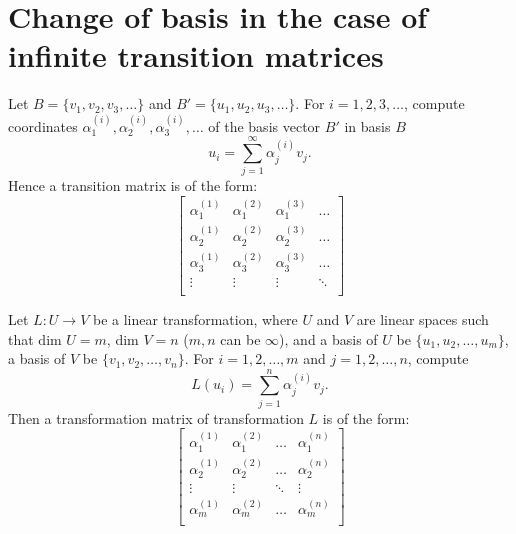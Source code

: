 \section{Change of basis in the case of infinite transition matrices }
Let $B = \{v_1, v_2, v_3, \ldots\}$ and $B' = \{u_1, u_2, u_3, \ldots\}$. For $i = 1, 2, 3, \ldots$, compute coordinates $\alpha^{(i)}_1, \alpha^{(i)}_2, \alpha^{(i)}_3, \ldots$ of the basis vector $B'$ in basis $B$
\[ u_i = \sum_{j=1}^{\infty} \alpha^{(i)}_j v_j. \]
Hence a transition matrix is of the form:
\[
\begin{bmatrix}
    \alpha^{(1)}_1 & \alpha^{(2)}_1 & \alpha^{(3)}_1 & \ldots \\
    \alpha^{(1)}_2 & \alpha^{(2)}_2 & \alpha^{(3)}_2 & \ldots \\
    \alpha^{(1)}_3 & \alpha^{(2)}_3 & \alpha^{(3)}_3 & \ldots \\
    \vdots & \vdots & \vdots & \ddots \\
\end{bmatrix}
\]

Let \(L: U \to V\) be a linear transformation, where $U$ and $V$ are linear spaces such that \(\text{dim } U = m\), \(\text{dim } V = n\) (\(m, n\) can be \(\infty\)), and a basis of \(U\) be \(\{u_1, u_2, \ldots, u_m\}\), a basis of \(V\) be \(\{v_1, v_2, \ldots, v_n\}\). For \(i = 1, 2, \ldots, m\) and \(j = 1, 2, \ldots, n\), compute
\[
L(u_i) = \sum_{j=1}^n \alpha^{(i)}_j v_j.
\]
Then a transformation matrix of transformation \(L\) is of the form:
\[
\begin{bmatrix}
    \alpha^{(1)}_1 & \alpha^{(2)}_1 & \ldots & \alpha^{(n)}_1 \\
    \alpha^{(1)}_2 & \alpha^{(2)}_2 & \ldots & \alpha^{(n)}_2 \\
    \vdots & \vdots & \ddots & \vdots \\
    \alpha^{(1)}_m & \alpha^{(2)}_m & \ldots & \alpha^{(n)}_m \\
\end{bmatrix}
\]

